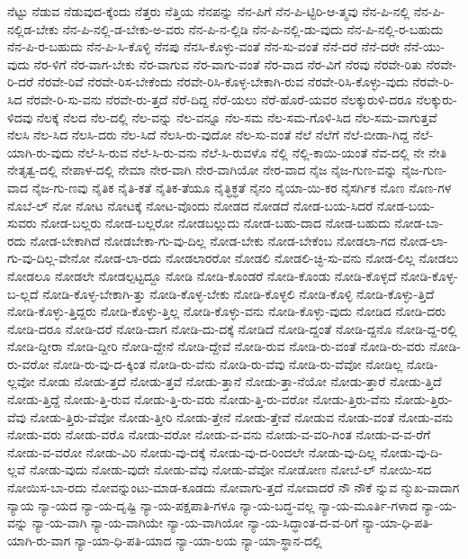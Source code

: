 {ನೆಟ್ಟು
ನೆಡುವ
ನೆಡುವುದ-ಕ್ಕೆಂದು
ನೆತ್ತರು
ನೆತ್ತಿಯ
ನೆನಪನ್ನು
ನೆನ-ಪಿಗೆ
ನೆನ-ಪಿ-ಟ್ಟಿರಿ-ಆ-ತ್ಮವು
ನೆನ-ಪಿ-ನಲ್ಲಿ
ನೆನ-ಪಿ-ನಲ್ಲಿಡ-ಬೇಕು
ನೆನ-ಪಿ-ನಲ್ಲಿ-ಡ-ಬೇಕು-ಅ-ವರು
ನೆನ-ಪಿ-ನ-ಲ್ಲಿಡಿ
ನೆನ-ಪಿ-ನಲ್ಲಿ-ಡು-ವುದು
ನೆನ-ಪಿ-ನಲ್ಲಿ-ರ-ಬಹುದು
ನೆನ-ಪಿ-ರ-ಬಹುದು
ನೆನ-ಪಿ-ಸಿ-ಕೊಳ್ಳಿ
ನೆನಪು
ನೆನಸಿ-ಕೊಳ್ಳು-ವಂತೆ
ನೆನ-ಸು-ವಂತೆ
ನೆನೆ-ದರೆ
ನೆನೆ-ದರೇ
ನೆನೆ-ಯು-ವುದು
ನೆರ-ಳಿಗೆ
ನೆರ-ವಾಗ-ಬೇಕು
ನೆರ-ವಾಗುವ
ನೆರ-ವಾಗು-ವಂತೆ
ನೆರ-ವಾದ
ನೆರ-ವಿಗೆ
ನೆರವು
ನೆರವೇ-ರಿತು
ನೆರವೇ-ರಿ-ದರೆ
ನೆರವೇ-ರಿವೆ
ನೆರವೇ-ರಿಸ-ಬೇಕೆಂದು
ನೆರವೇ-ರಿಸಿ-ಕೊಳ್ಳ-ಬೇಕಾಗಿ-ರುವ
ನೆರವೇ-ರಿಸಿ-ಕೊಳ್ಳು-ವುದು
ನೆರವೇ-ರಿ-ಸಿದ
ನೆರವೇ-ರಿ-ಸು-ವನು
ನೆರವೇ-ರು-ತ್ತದೆ
ನೆರೆ-ದಿದ್ದ
ನೆರೆ-ಯಲು
ನೆರೆ-ಹೊರೆ-ಯವರ
ನೆಲಕ್ಕುರುಳಿ-ದರೂ
ನೆಲಕ್ಕುರು-ಳಿದವು
ನೆಲಕ್ಕೆ
ನೆಲದ
ನೆಲ-ದಲ್ಲಿ
ನೆಲ-ವನ್ನು
ನೆಲ-ವನ್ನೂ
ನೆಲ-ಸಮ
ನೆಲ-ಸಮ-ಗೊಳಿ-ಸಿದ
ನೆಲ-ಸಮ-ವಾಗುತ್ತವೆ
ನೆಲಸಿ
ನೆಲ-ಸಿದ
ನೆಲಸಿ-ದರು
ನೆಲ-ಸಿದೆ
ನೆಲಸಿ-ರು-ವುದೋ
ನೆಲ-ಸು-ವಂತೆ
ನೆಲೆ
ನೆಲೆಗೆ
ನೆಲೆ-ಬೀಡಾ-ಗಿದ್ದ
ನೆಲೆ-ಯಾಗಿ-ರು-ವುದು
ನೆಲೆ-ಸಿ-ರುವ
ನೆಲೆ-ಸಿ-ರು-ವನು
ನೆಲೆ-ಸಿ-ರುವಳೊ
ನೆಲ್ಲಿ
ನೆಲ್ಲಿ-ಕಾಯಿ-ಯಂತೆ
ನೆವ-ದಲ್ಲಿ
ನೇ
ನೇತಿ
ನೇತೃತ್ವ-ದಲ್ಲಿ
ನೇಪಾಳ-ದಲ್ಲಿ
ನೇಮಾ
ನೇರ-ವಾಗಿ
ನೇರ-ವಾಗಿಯೋ
ನೇರ-ವಾದ
ನೈಜ
ನೈಜ-ಗುಣ-ವನ್ನು
ನೈಜ-ಗುಣ-ವಾದ
ನೈಜ-ಗು-ಣವು
ನೈತಿಕ
ನೈತಿ-ಕತೆ
ನೈತಿಕ-ತೆಯೂ
ನೈತ್ಧಿಕ್ಧತೆ
ನೈನಂ
ನೈಯಾ-ಯಿ-ಕರ
ನೈಸರ್ಗಿಕ
ನೊಣ
ನೊಣ-ಗಳ
ನೊಬೆ-ಲ್
ನೋ
ನೋಟ
ನೋಟಕ್ಕೆ
ನೋಟ-ವೊಂದು
ನೋಡದ
ನೋಡದೆ
ನೋಡ-ಬಯ-ಸಿದರೆ
ನೋಡ-ಬಯ-ಸುವರು
ನೋಡ-ಬಲ್ಲರು
ನೋಡ-ಬಲ್ಲರೋ
ನೋಡಬಲ್ಲುದು
ನೋಡ-ಬಹು-ದಾದ
ನೋಡ-ಬಹುದು
ನೋಡ-ಬಾ-ರದು
ನೋಡ-ಬೇಕಾಗಿದೆ
ನೋಡಬೇಕಾ-ಗು-ವು-ದಿಲ್ಲ
ನೋಡ-ಬೇಕು
ನೋಡ-ಬೇಕೆಂಬ
ನೋಡಲಾ-ಗದ
ನೋಡ-ಲಾ-ಗು-ವು-ದಿಲ್ಲ-ವೇನೋ
ನೋಡ-ಲಾ-ರದು
ನೋಡಲಾರರೋ
ನೋಡಲಿ
ನೋಡಲಿ-ಚ್ಛಿ-ಸು-ವನು
ನೋಡ-ಲಿಲ್ಲ
ನೋಡಲು
ನೋಡಲೂ
ನೋಡಲೇ
ನೋಡಲ್ಪಟ್ಟದ್ದೂ
ನೋಡಿ
ನೋಡಿ-ಕೊಂಡರೆ
ನೋಡಿ-ಕೊಂಡು
ನೋಡಿ-ಕೊಳ್ಳದೆ
ನೋಡಿ-ಕೊಳ್ಳ-ಬ-ಲ್ಲದೆ
ನೋಡಿ-ಕೊಳ್ಳ-ಬೇಕಾಗಿ-ತ್ತು
ನೋಡಿ-ಕೊಳ್ಳ-ಬೇಕು
ನೋಡಿ-ಕೊಳ್ಳಲಿ
ನೋಡಿ-ಕೊಳ್ಳಿ
ನೋಡಿ-ಕೊಳ್ಳು-ತ್ತಿದೆ
ನೋಡಿ-ಕೊಳ್ಳು-ತ್ತಿದ್ದರು
ನೋಡಿ-ಕೊಳ್ಳು-ತ್ತಿಲ್ಲ
ನೋಡಿ-ಕೊಳ್ಳು-ವನು
ನೋಡಿ-ಕೊಳ್ಳು-ವುದು
ನೋಡಿದ
ನೋಡಿ-ದರು
ನೋಡಿ-ದರೂ
ನೋಡಿ-ದರೆ
ನೋಡಿ-ದಾಗ
ನೋಡಿ-ದು-ದಕ್ಕೆ
ನೋಡಿದೆ
ನೋಡಿ-ದ್ದಂತೆ
ನೋಡಿ-ದ್ದನೊ
ನೋಡಿ-ದ್ದ-ರಲ್ಲಿ
ನೋಡಿ-ದ್ದೀರಾ
ನೋಡಿ-ದ್ದೀರಿ
ನೋಡಿ-ದ್ದೇನೆ
ನೋಡಿ-ದ್ದೇವೆ
ನೋಡಿ-ರುವ
ನೋಡಿ-ರು-ವಂತೆ
ನೋಡಿ-ರು-ವರು
ನೋಡಿ-ರು-ವರೋ
ನೋಡಿ-ರು-ವು-ದ-ಕ್ಕಿಂತ
ನೋಡಿ-ರು-ವೆನು
ನೋಡಿ-ರು-ವೆವು
ನೋಡಿ-ರು-ವೆವೋ
ನೋಡಿಲ್ಲ
ನೋಡಿ-ಲ್ಲವೋ
ನೋಡು
ನೋಡು-ತ್ತದೆ
ನೋಡು-ತ್ತವೆ
ನೋಡು-ತ್ತಾನೆ
ನೋಡು-ತ್ತಾ-ನೆಯೋ
ನೋಡು-ತ್ತಾರೆ
ನೋಡು-ತ್ತಿದೆ
ನೋಡು-ತ್ತಿದ್ದೆ
ನೋಡು-ತ್ತಿ-ರುವ
ನೋಡು-ತ್ತಿ-ರು-ವರು
ನೋಡು-ತ್ತಿ-ರು-ವರೋ
ನೋಡು-ತ್ತಿರು-ವೆನು
ನೋಡು-ತ್ತಿರು-ವೆವು
ನೋಡು-ತ್ತಿರು-ವೆವೋ
ನೋಡು-ತ್ತೀರಿ
ನೋಡು-ತ್ತೇನೆ
ನೋಡು-ತ್ತೇವೆ
ನೋಡುವ
ನೋಡು-ವಂತೆ
ನೋಡು-ವನು
ನೋಡು-ವರು
ನೋಡು-ವರೊ
ನೋಡು-ವರೋ
ನೋಡು-ವ-ವನು
ನೋಡು-ವ-ವರಿ-ಗಿಂತ
ನೋಡು-ವ-ವ-ರೆಗೆ
ನೋಡು-ವ-ವರೋ
ನೋಡು-ವಿರಿ
ನೋಡು-ವು-ದಕ್ಕೆ
ನೋಡು-ವು-ದ-ರಿಂದಲೇ
ನೋಡು-ವು-ದಿಲ್ಲ
ನೋಡು-ವು-ದಿ-ಲ್ಲವೆ
ನೋಡು-ವುದು
ನೋಡು-ವುದೇ
ನೋಡು-ವೆವು
ನೋಡು-ವೆವೋ
ನೋಡೋಣ
ನೋಬೆ-ಲ್
ನೋಯಿ-ಸದ
ನೋಯಿಸ-ಬಾ-ರದು
ನೋವನ್ನುಂಟು-ಮಾಡ-ಕೂಡದು
ನೋವಾಗು-ತ್ತದೆ
ನೋವಾದರೆ
ನೌ
ನೌಕೆ
ನ್ನುವ
ನ್ಮುಖ-ವಾದಾಗ
ನ್ಯಾಯ
ನ್ಯಾ-ಯದ
ನ್ಯಾ-ಯ-ದೃಷ್ಟಿ
ನ್ಯಾ-ಯ-ಪಕ್ಷಪಾತಿ-ಗಳೂ
ನ್ಯಾ-ಯ-ಬದ್ಧ-ವಲ್ಲ
ನ್ಯಾ-ಯ-ಮೂರ್ತಿ-ಗಳಾದ
ನ್ಯಾ-ಯ-ವನ್ನು
ನ್ಯಾ-ಯ-ವಾಗಿ
ನ್ಯಾ-ಯ-ವಾಗಿಯೇ
ನ್ಯಾ-ಯ-ವಾಗಿಯೋ
ನ್ಯಾ-ಯ-ಸಿದ್ಧಾಂತ-ದ-ವ-ರಿಗೆ
ನ್ಯಾ-ಯಾ-ಧಿ-ಪತಿ-ಯಾಗಿ-ರು-ವಾಗ
ನ್ಯಾ-ಯಾ-ಧಿ-ಪತಿ-ಯಾದ
ನ್ಯಾ-ಯಾ-ಲಯ
ನ್ಯಾ-ಯಾ-ಸ್ಥಾನ-ದಲ್ಲಿ
}
